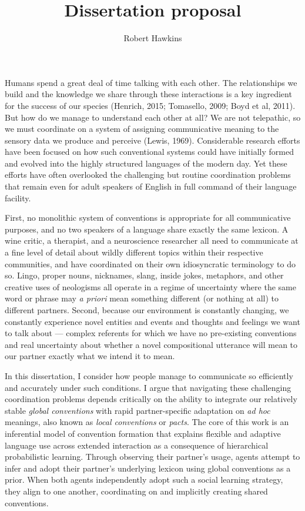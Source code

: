 \documentclass[12pt, donotrepeattitle, man, floatsintext]{apa6}
\title{Dissertation proposal}
\author{Robert Hawkins}
\affiliation{Stanford University}
\begin{document}
\thispagestyle{otherpage}

\maketitle

Humans spend a great deal of time talking with each other. The relationships we build and the knowledge we share through these interactions is a key ingredient for the success of our species (Henrich, 2015; Tomasello, 2009; Boyd et al, 2011). But how do we manage to understand each other at all? We are not telepathic, so we must coordinate on a system of assigning communicative meaning to the sensory data we produce and perceive (Lewis, 1969). Considerable research efforts have been focused on how such conventional systems could have initially formed and evolved into the highly structured languages of the modern day. Yet these efforts have often overlooked the challenging but routine coordination problems that remain even for adult speakers of English in full command of their language facility. 

First, no monolithic system of conventions is appropriate for all communicative purposes, and no two speakers of a language share exactly the same lexicon. A wine critic, a therapist, and a neuroscience researcher all need to communicate at a fine level of detail about wildly different topics within their respective communities, and have coordinated on their own idiosyncratic terminology to do so. Lingo, proper nouns, nicknames, slang, inside jokes, metaphors, and other creative uses of neologisms all operate in a regime of uncertainty where the same word or phrase may \emph{a priori} mean something different (or nothing at all) to different partners. Second, because our environment is constantly changing, we constantly experience novel entities and events and thoughts and feelings we want to talk about --- complex referents for which we have no pre-existing conventions and real uncertainty about whether a novel compositional utterance will mean to our partner exactly what we intend it to mean. 

In this dissertation, I consider how people manage to communicate so efficiently and accurately under such conditions. I argue that navigating these challenging coordination problems depends critically on the ability to integrate our relatively stable \emph{global conventions} with rapid partner-specific adaptation on \emph{ad hoc} meanings, also known as \emph{local conventions} or \emph{pacts}. The core of this work is an inferential model of convention formation that explains flexible and adaptive language use across extended interaction as a consequence of hierarchical probabilistic learning. Through observing their partner's usage, agents attempt to infer and adopt their partner's underlying lexicon using global conventions as a prior. When both agents independently adopt such a social learning strategy, they align to one another, coordinating on and implicitly creating shared conventions. 
\end{document}
